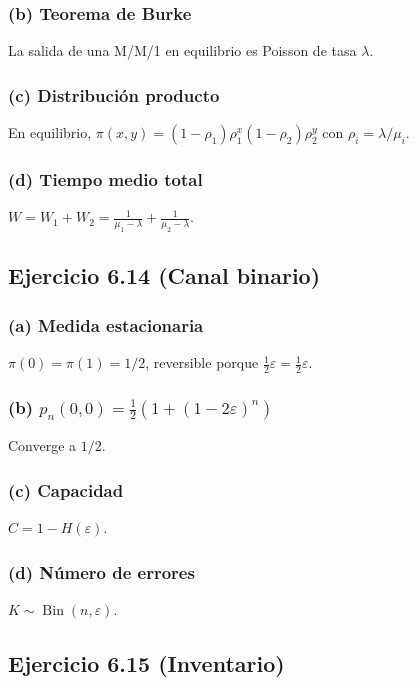 \documentclass[letterpaper, 12pt]{article}
\newcommand{\1}{\mathbbm{1}}
\DeclareMathOperator{\Bin}{Bin}
\begin{document}
    \subsubsection*{(b) Teorema de Burke}
    La salida de una M/M/1 en equilibrio es Poisson de tasa $\lambda$.

    \subsubsection*{(c) Distribuci\'on producto}
    En equilibrio, $\pi(x,y)=(1-\rho_1)\rho_1^x(1-\rho_2)\rho_2^y$ con $\rho_i=\lambda/\mu_i$.

    \subsubsection*{(d) Tiempo medio total}
    $W=W_1+W_2=\frac{1}{\mu_1-\lambda}+\frac{1}{\mu_2-\lambda}$.

    \subsection{Ejercicio 6.14 (Canal binario)}

    \subsubsection*{(a) Medida estacionaria}
    $\pi(0)=\pi(1)=1/2$, reversible porque $\frac12\varepsilon=\frac12\varepsilon$.

    \subsubsection*{(b) $p_n(0,0)=\frac12(1+(1-2\varepsilon)^n)$}
    Converge a $1/2$.

    \subsubsection*{(c) Capacidad}
    $C=1-H(\varepsilon)$.

    \subsubsection*{(d) N\'umero de errores}
    $K\sim\Bin(n,\varepsilon)$.

    \subsection{Ejercicio 6.15 (Inventario)}
\end{document}
